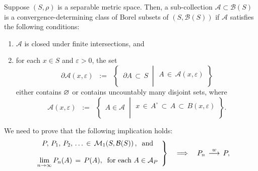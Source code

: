 \begin{theorem}
\mbox{}
\vskip 0.1cm
\noindent
Suppose $\left(S,\rho\right)$ is a {\color{red}separable} metric space.
Then, a sub-collection $\mathcal{A} \subset \mathcal{B}(S)$ is a
convergence-determining class of Borel subsets of
$\left(S,\mathcal{B}(S)\right)$ if $\mathcal{A}$ satisfies the following conditions:
\begin{enumerate}
\item	$\mathcal{A}$ is closed under finite intersections, and
\item	for each $x \in S$ and $\varepsilon > 0$, the set
		\begin{equation*}
		\partial\mathcal{A}(x,\varepsilon)
		\;\; := \;\;
		\left\{\;\;
		\partial A \,\subset\, S
		\;\;\left\vert\;
		\begin{array}{c}
			\\
			A \,\in\, \mathcal{A}(x,\varepsilon)
			\\ \\
		\end{array}
		\right.
		\right\}
		\end{equation*}
		either contains $\varnothing$ or contains uncountably many disjoint sets,
		where
		\begin{equation*}
		\mathcal{A}(x,\varepsilon)
		\;\; := \;\;
		\left\{\;\,
		A \in \mathcal{A}
		\;\;\left\vert\;
		\begin{array}{c}
			\\
			x \,\in\, A^{\circ} \,\subset\, A \,\subset\, B(x,\varepsilon)
			\\ \\
		\end{array}
		\right.
		\right\}.
		\end{equation*}		
\end{enumerate}
\end{theorem}
\proof
We need to prove that the following implication holds:
\begin{equation*}
\left.
\begin{array}{c}
	P,\,P_{1},\,P_{2},\,\ldots\,\in\,\mathcal{M}_{1}\!\left(S,\mathcal{B}(S)\right),\;\;\textnormal{and}
	\\ \\
	\underset{n\rightarrow\infty}{\lim}\,P_{n}(A) \,=\, P(A),\;\;\textnormal{for each $A \in \mathcal{A}_{P}$}
\end{array}
\right\}
\quad\Longrightarrow\quad
P_{n} \,\overset{w}{\longrightarrow}\, P,
\end{equation*}
